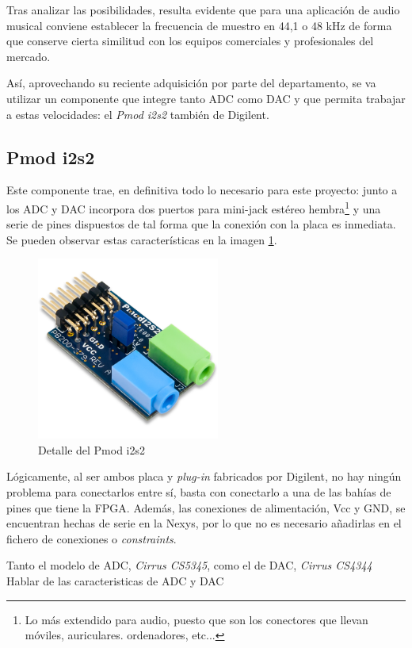 Tras analizar las posibilidades, resulta evidente que para una aplicación de audio musical conviene establecer la frecuencia de muestro en 44,1 o 48 kHz de forma que conserve cierta similitud con los equipos comerciales y profesionales del mercado.

Así, aprovechando su reciente adquisición por parte del departamento, se va utilizar un componente que integre tanto ADC como DAC y que permita trabajar a estas velocidades: el \emph{Pmod i2s2} también de Digilent.

\subsection{Pmod i2s2}
Este componente trae, en definitiva todo lo necesario para este proyecto: junto a los ADC y DAC incorpora dos puertos para mini-jack estéreo hembra\footnote{Lo más extendido para audio, puesto que son los conectores que llevan móviles, auriculares. ordenadores, etc...} y una serie de pines dispuestos de tal forma que la conexión con la placa es inmediata. Se pueden observar estas características en la imagen \ref{fig:pmod}.

\begin{figure}[!ht]
\begin{center}
\includegraphics[width=6cm]{img/pmod.png}
\caption{\label{fig:pmod}Detalle del Pmod i2s2}
\end{center}
\end{figure}

Lógicamente, al ser ambos placa y \emph{plug-in} fabricados por Digilent, no hay ningún problema para conectarlos entre sí, basta con conectarlo a una de las bahías de pines que tiene la FPGA. Además, las conexiones de alimentación, Vcc y GND, se encuentran hechas de serie en la Nexys, por lo que no es necesario añadirlas en el fichero de conexiones o \emph{constraints}.

Tanto el modelo de ADC, \emph{Cirrus CS5345}, como el de DAC, \emph{Cirrus CS4344}
Hablar de las caracteristicas de ADC y DAC

